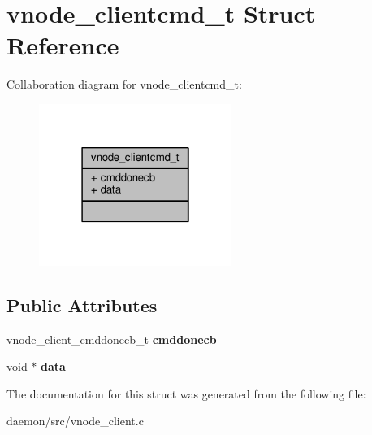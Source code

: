 \hypertarget{structvnode__clientcmd__t}{\section{vnode\+\_\+clientcmd\+\_\+t Struct Reference}
\label{structvnode__clientcmd__t}
}


Collaboration diagram for vnode\+\_\+clientcmd\+\_\+t\+:
\nopagebreak
\begin{figure}[H]
\begin{center}
\leavevmode
\includegraphics[width=178pt]{structvnode__clientcmd__t__coll__graph}
\end{center}
\end{figure}
\subsection*{Public Attributes}
\begin{DoxyCompactItemize}
\item 
\hypertarget{structvnode__clientcmd__t_a5705fe1b24a1073c1cc49804c3e6679f}{vnode\+\_\+client\+\_\+cmddonecb\+\_\+t {\bfseries cmddonecb}}\label{structvnode__clientcmd__t_a5705fe1b24a1073c1cc49804c3e6679f}

\item 
\hypertarget{structvnode__clientcmd__t_a8e648a3e4c62b07dc24b2bc8556032d3}{void $\ast$ {\bfseries data}}\label{structvnode__clientcmd__t_a8e648a3e4c62b07dc24b2bc8556032d3}

\end{DoxyCompactItemize}


The documentation for this struct was generated from the following file\+:\begin{DoxyCompactItemize}
\item 
daemon/src/vnode\+\_\+client.\+c\end{DoxyCompactItemize}
